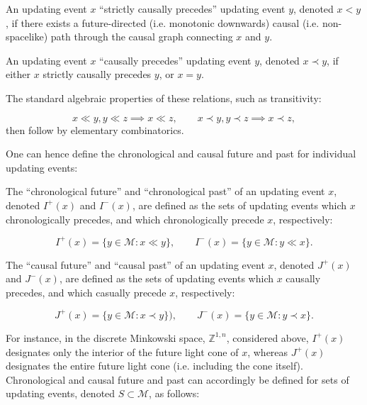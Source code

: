 \documentclass{article}
\begin{document}
\begin{definition}
An updating event $x$ ``strictly causally precedes'' updating event $y$, denoted ${x < y}$, if there exists a future-directed (i.e. monotonic downwards) causal (i.e. non-spacelike) path through the causal graph connecting $x$ and $y$.
\end{definition}

\begin{definition}
An updating event $x$ ``causally precedes'' updating event $y$, denoted ${x \prec y}$, if either $x$ strictly causally precedes $y$, or ${x = y}$.
\end{definition}
The standard algebraic properties of these relations, such as transitivity:

\begin{equation}
x \ll y, y \ll z \implies x \ll z, \qquad x \prec y, y \prec z \implies x \prec z,
\end{equation}
then follow by elementary combinatorics.

One can hence define the chronological and causal future and past for individual updating events:

\begin{definition}
The ``chronological future'' and ``chronological past'' of an updating event $x$, denoted ${I^{+} \left( x \right)}$ and ${I^{-} \left( x \right)}$, are defined as the sets of updating events which $x$ chronologically precedes, and which chronologically precede $x$, respectively:

\begin{equation}
I^{+} \left( x \right) = \lbrace y \in \mathcal{M} : x \ll y \rbrace, \qquad I^{-} \left( x \right) = \lbrace y \in \mathcal{M} : y \ll x \rbrace.
\end{equation}
\end{definition}

\begin{definition}
The ``causal future'' and ``causal past'' of an updating event $x$, denoted ${J^{+} \left( x \right)}$ and ${J^{-} \left( x \right)}$, are defined as the sets of updating events which $x$ causally precedes, and which casually precede $x$, respectively:

\begin{equation}
J^{+} \left( x \right) = \lbrace y \in \mathcal{M} : x \prec y \rbrace), \qquad J^{-} \left( x \right) = \lbrace y \in \mathcal{M} : y \prec x \rbrace.
\end{equation}
\end{definition}
For instance, in the discrete Minkowski space, ${\mathbb{Z}^{1, n}}$, considered above, ${I^{+} \left( x \right)}$ designates only the interior of the future light cone of $x$, whereas ${J^{+} \left( x \right)}$ designates the entire future light cone (i.e. including the cone itself). Chronological and causal future and past can accordingly be defined for sets of updating events, denoted ${S \subset \mathcal{M}}$, as follows:
\end{document}
